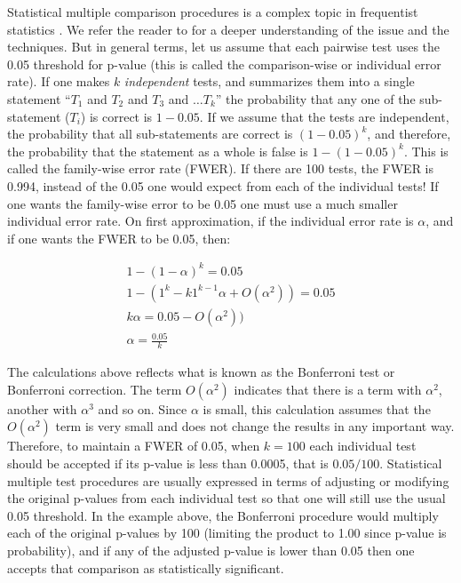 \documentclass[twoside,11pt,preprint]{article}
\begin{document}
Statistical multiple comparison procedures is a complex topic in
frequentist statistics \citep{feise2002multiple, rothman1990no, bender2001adjusting}. We refer the reader to
\citep{farcomeni2008review, garcia2008extension} for a deeper
understanding of the issue and the techniques.
But in general terms, let us assume that each pairwise test uses the 0.05
threshold for p-value (this is called the
comparison-wise or individual error rate). If one makes \(k\)
\emph{independent} tests, and summarizes them into a single statement
``\(T_1\) and \(T_2\) and \(T_3\) and \(\ldots T_k\)'' the probability that any
one of the sub-statement (\(T_i\)) is correct is \(1-0.05\). If we assume
that the tests are independent, the probability that all
sub-statements are correct is \((1-0.05)^k\), and therefore, the
probability that the statement as a whole is false is \(1- (1-0.05)^k\).
This is called the family-wise error rate (FWER). If there are 100
tests, the FWER is 0.994, instead of the 0.05 one would expect from
each of the individual tests! If one wants the family-wise error to
be 0.05 one must use a much smaller individual error rate. On first
approximation, if the individual error rate is \(\alpha\), and if one wants the FWER to be 0.05, then:

\begin{align*}
1- (1-\alpha)^k  = 0.05\\
1 - (1^k -k 1^{k-1} \alpha + O(\alpha^2)) = 0.05\\
k \alpha = 0.05 - O(\alpha^2))\\
\alpha = \frac{0.05}{k}
\end{align*}

The calculations above reflects what is known as the Bonferroni test or Bonferroni
correction. The term \(O(\alpha^2)\) indicates that there is a term
with \(\alpha^2\), another with \(\alpha^3\) and so
on. Since \(\alpha\) is small, this calculation assumes that the
\(O(\alpha^2)\) term is very small and does not change the results in
any important way. Therefore, to maintain a FWER of 0.05, when
\(k=100\) each individual test should be accepted if its p-value is less
than 0.0005, that is \(0.05/100\). Statistical multiple test procedures
are usually expressed in terms of adjusting or modifying the original
p-values from each individual test so that one will still use the usual
0.05 threshold. In the example above, the Bonferroni procedure would
multiply each of the original p-values by 100 (limiting the product to
1.00 since p-value is probability), and if any of the adjusted p-value
is lower than 0.05 then one accepts that comparison as statistically
significant.
\end{document}
